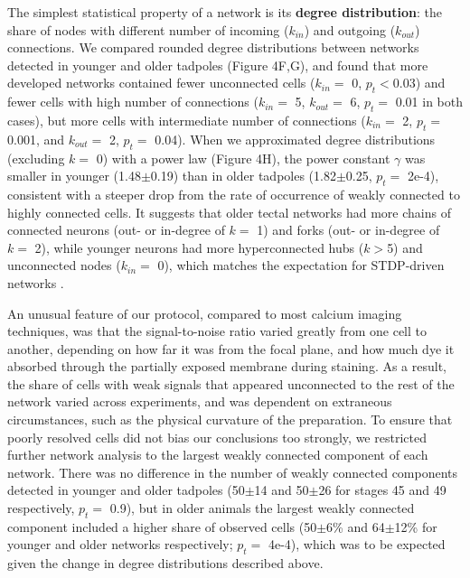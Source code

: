 \documentclass{article}
\begin{document}
The simplest statistical property of a network is its \textbf{degree distribution}: the share of nodes with different number of incoming ($k_{in}$) and outgoing ($k_{out}$) connections. We compared rounded degree distributions between networks detected in younger and older tadpoles (Figure 4F,G), and found that more developed networks contained fewer unconnected cells ($k_{in}=$ 0, $p_t<$0.03) and fewer cells with high number of connections ($k_{in}=$ 5, $k_{out}=$ 6, $p_t=$ 0.01 in both cases), but more cells with intermediate number of connections ($k_{in}=$ 2, $p_t=$ 0.001, and $k_{out}=$ 2, $p_t=$ 0.04). When we approximated degree distributions (excluding $k=$ 0) with a power law (Figure 4H), the power constant $\gamma$ was smaller in younger (1.48$\pm$0.19) than in older tadpoles (1.82$\pm$0.25, $p_t=$ 2e-4), consistent with a steeper drop from the rate of occurrence of weakly connected to highly connected cells. It suggests that older tectal networks had more chains of connected neurons (out- or in-degree of $k=$ 1) and forks (out- or in-degree of $k=$ 2), while younger neurons had more hyperconnected hubs ($k>$5) and unconnected nodes ($k_{in}=$ 0), which matches the expectation for STDP-driven networks \citep{fiete2010chains}.

An unusual feature of our protocol, compared to most calcium imaging techniques, was that the signal-to-noise ratio varied greatly from one cell to another, depending on how far it was from the focal plane, and how much dye it absorbed through the partially exposed membrane during staining. As a result, the share of cells with weak signals that appeared unconnected to the rest of the network varied across experiments, and was dependent on extraneous circumstances, such as the physical curvature of the preparation. To ensure that poorly resolved cells did not bias our conclusions too strongly, we restricted further network analysis to the largest weakly connected component of each network. There was no difference in the number of weakly connected components detected in younger and older tadpoles (50$\pm$14 and 50$\pm$26 for stages 45 and 49 respectively, $p_t=$ 0.9), but in older animals the largest weakly connected component included a higher share of observed cells (50$\pm$6\% and 64$\pm$12\% for younger and older networks respectively; $p_t=$ 4e-4), which was to be expected given the change in degree distributions described above.
\end{document}
